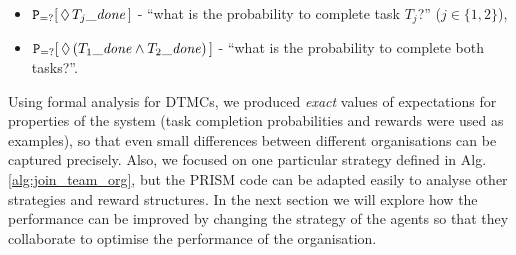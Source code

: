 \documentclass{llncs}
\begin{document}
\begin{itemize}
 \item ${\tt P}_{=?}[\,\Diamond\,T_{j} \mathit{\_done}\,]$ -
``what is the probability to complete  task $T_j$?'' ($j\in\{1,2\}$),
 \item ${\tt P}_{=?}[\,\Diamond\,(T_{1} \mathit{\_done} \wedge T_2 \mathit{\_done})\,]$ -
``what is the probability to complete  both tasks?''. %
\end{itemize}
\begin{table}[h]
 \centering
{}
\caption{Task completion probabilities for optimal agent organisations using Alg.~\ref{alg:join_team_org}'s offline and online versions (see Alg.~\ref{alg:main_process}).}
\label{tab:task_compl_dtmc}
\end{table}
Using formal analysis for DTMCs, we produced \emph{exact} values of expectations for properties of the system (task completion probabilities and rewards were used as examples), so that even small differences between different organisations can be captured precisely. Also, we focused on one particular strategy defined in Alg. \ref{alg:join_team_org}, but the PRISM code can be adapted easily to analyse other strategies and reward structures. In the next section we will explore how the performance can be improved by changing the strategy of the agents so that they collaborate to optimise the performance of the organisation.
\end{document}
